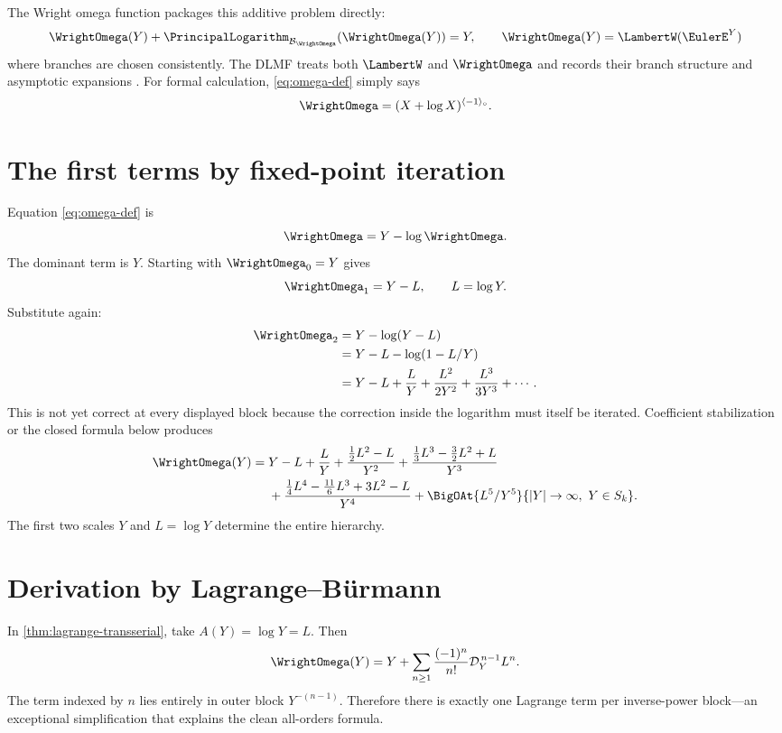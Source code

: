 \documentclass[11pt,oneside]{book}
\theoremstyle{definition}
\theoremstyle{remark}
\newcommand{\D}{\mathcal D}
\newcommand{\compinv}{^{\langle-1\rangle_{\circ}}}
\newcommand{\LogarithmOnBranch}[2]{%
  \PrincipalLogarithm_{#1}\!\left(#2\right)%
}
\begin{document}
The Wright omega function packages this additive problem directly:
\begin{equation}\label{eq:omega-def}
 \WrightOmega(Y)+\LogarithmOnBranch{\mathcal B_\WrightOmega}{\WrightOmega(Y)}=Y,
 \qquad
 \WrightOmega(Y)=\LambertW(\EulerE^Y)
\end{equation}
where branches are chosen consistently.  The DLMF treats both $\LambertW$ and
$\WrightOmega$ and records their branch structure and asymptotic expansions
\cite{DLMF413}.  For formal calculation, \eqref{eq:omega-def} simply says
\begin{equation}\label{eq:omega-inverse}
 \WrightOmega=(X+\log X)\compinv.
\end{equation}

\section{The first terms by fixed-point iteration}
Equation \eqref{eq:omega-def} is
\begin{equation}\label{eq:omega-fixed}
 \WrightOmega=Y-\log\WrightOmega.
\end{equation}
The dominant term is $Y$.  Starting with $\WrightOmega_0=Y$ gives
\[
 \WrightOmega_1=Y-L,
 \qquad L=\log Y.
\]
Substitute again:
\begin{align*}
 \WrightOmega_2
 &=Y-\log(Y-L)\\
 &=Y-L-\log(1-L/Y)\\
 &=Y-L+\frac{L}{Y}+\frac{L^2}{2Y^2}
   +\frac{L^3}{3Y^3}+\cdots.
\end{align*}
This is not yet correct at every displayed block because the correction inside
the logarithm must itself be iterated.  Coefficient stabilization or the
closed formula below produces
\begin{align}\label{eq:omega-first-terms}
 \WrightOmega(Y)={}&Y-L+\frac{L}{Y}
 +\frac{\frac12L^2-L}{Y^2}
 +\frac{\frac13L^3-\frac32L^2+L}{Y^3}\notag\\
 &+\frac{\frac14L^4-\frac{11}{6}L^3+3L^2-L}{Y^4}
 +\BigOAt{L^5/Y^5}{|Y|\to\infty,\ Y\in S_k}.
\end{align}
The first two scales $Y$ and $L=\log Y$ determine the entire hierarchy.

\section{Derivation by Lagrange--B\"urmann}
In \cref{thm:lagrange-transserial}, take $A(Y)=\log Y=L$.  Then
\begin{equation}\label{eq:omega-lagrange}
 \WrightOmega(Y)
 =Y+\sum_{n\ge1}\frac{(-1)^n}{n!}
 \D_Y^{\,n-1}L^n.
\end{equation}
The term indexed by $n$ lies entirely in outer block $Y^{-(n-1)}$.  Therefore
there is exactly one Lagrange term per inverse-power block---an exceptional
simplification that explains the clean all-orders formula.
\end{document}
